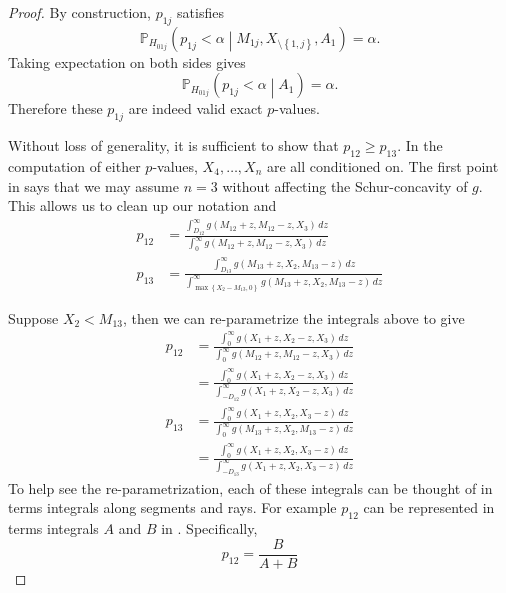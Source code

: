 \documentclass[11pt]{article}
\newcommand{\PP}{\mathbb{P}}
\begin{document}
\begin{proof}
By construction, $p_{1j}$ satisfies
$$\PP_{H_{01j}}\left(p_{1j} < \alpha \middle| M_{1j}, X_{\setminus\left\{1, j\right\}}, A_1\right) = \alpha.$$
Taking expectation on both sides gives
$$\PP_{H_{01j}}\left(p_{1j} < \alpha \middle| A_1\right) = \alpha.$$
Therefore these $p_{1j}$ are indeed valid exact $p$-values.

Without loss of generality, it is sufficient to show that $p_{12} \ge p_{13}$. In the computation of either $p$-values, $X_4, \ldots, X_n$ are all conditioned on. The first point in  says that we may assume $n = 3$ without affecting the Schur-concavity of $g$. This allows us to clean up our notation and
\begin{align*}
p_{12} & = \frac{\int_{D_{12}}^\infty g\left(M_{12} + z, M_{12} - z, X_3\right) \,dz}{\int_0^\infty g\left(M_{12} + z, M_{12} - z, X_3\right) \,dz} \\
p_{13} & = \frac{\int_{D_{13}}^\infty g\left(M_{13} + z, X_2, M_{13} - z\right) \,dz}{\int_{\max\left\{X_2 - M_{13}, 0\right\}}^\infty g\left(M_{13} + z, X_2, M_{13} - z\right) \,dz}
\end{align*}

Suppose $X_2 < M_{13}$, then we can re-parametrize the integrals above to give
\begin{align*}
p_{12} & = \frac{\int_0^\infty g\left(X_1 + z, X_2 - z, X_3\right) \,dz}{\int_0^\infty g\left(M_{12} + z, M_{12} - z, X_3\right) \,dz} \\
& = \frac{\int_0^\infty g\left(X_1 + z, X_2 - z, X_3\right) \,dz}{\int_{-D_{12}}^\infty g\left(X_1 + z, X_2 - z, X_3\right) \,dz} \\
p_{13} & = \frac{\int_0^\infty g\left(X_1 + z, X_2, X_3 - z\right) \,dz}{\int_0^\infty g\left(M_{13} + z, X_2, M_{13} - z\right) \,dz} \\
& = \frac{\int_0^\infty g\left(X_1 + z, X_2, X_3 - z\right) \,dz}{\int_{-D_{13}}^\infty g\left(X_1 + z, X_2, X_3 - z\right) \,dz}
\end{align*}
To help see the re-parametrization, each of these integrals can be thought of in terms integrals along segments and rays. For example $p_{12}$ can be represented in terms integrals $A$ and $B$ in . Specifically,
$$p_{12} = \frac{B}{A + B}$$


\end{proof}
\end{document}
